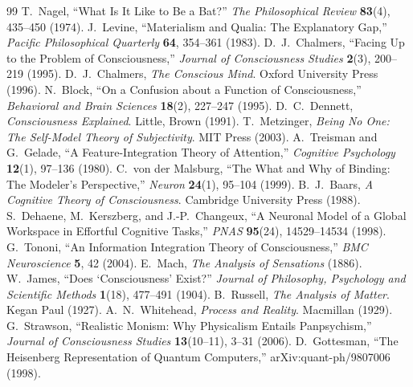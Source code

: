 \documentclass[11pt]{article}
\begin{document}
\begin{thebibliography}{99}
 T.~Nagel, ``What Is It Like to Be a Bat?'' \emph{The Philosophical Review} \textbf{83}(4), 435--450 (1974).
 J.~Levine, ``Materialism and Qualia: The Explanatory Gap,'' \emph{Pacific Philosophical Quarterly} \textbf{64}, 354--361 (1983).
 D.~J.~Chalmers, ``Facing Up to the Problem of Consciousness,'' \emph{Journal of Consciousness Studies} \textbf{2}(3), 200--219 (1995).
 D.~J.~Chalmers, \emph{The Conscious Mind}. Oxford University Press (1996).
 N.~Block, ``On a Confusion about a Function of Consciousness,'' \emph{Behavioral and Brain Sciences} \textbf{18}(2), 227--247 (1995).
 D.~C.~Dennett, \emph{Consciousness Explained}. Little, Brown (1991).
 T.~Metzinger, \emph{Being No One: The Self-Model Theory of Subjectivity}. MIT Press (2003).
 A.~Treisman and G.~Gelade, ``A Feature-Integration Theory of Attention,'' \emph{Cognitive Psychology} \textbf{12}(1), 97--136 (1980).
 C.~von der Malsburg, ``The What and Why of Binding: The Modeler's Perspective,'' \emph{Neuron} \textbf{24}(1), 95--104 (1999).
 B.~J.~Baars, \emph{A Cognitive Theory of Consciousness}. Cambridge University Press (1988).
 S.~Dehaene, M.~Kerszberg, and J.-P.~Changeux, ``A Neuronal Model of a Global Workspace in Effortful Cognitive Tasks,'' \emph{PNAS} \textbf{95}(24), 14529--14534 (1998).
 G.~Tononi, ``An Information Integration Theory of Consciousness,'' \emph{BMC Neuroscience} \textbf{5}, 42 (2004).
 E.~Mach, \emph{The Analysis of Sensations} (1886).
 W.~James, ``Does `Consciousness' Exist?'' \emph{Journal of Philosophy, Psychology and Scientific Methods} \textbf{1}(18), 477--491 (1904).
 B.~Russell, \emph{The Analysis of Matter}. Kegan Paul (1927).
 A.~N.~Whitehead, \emph{Process and Reality}. Macmillan (1929).
 G.~Strawson, ``Realistic Monism: Why Physicalism Entails Panpsychism,'' \emph{Journal of Consciousness Studies} \textbf{13}(10--11), 3--31 (2006).
 D.~Gottesman, ``The Heisenberg Representation of Quantum Computers,'' arXiv:quant-ph/9807006 (1998).

\end{thebibliography}
\end{document}

